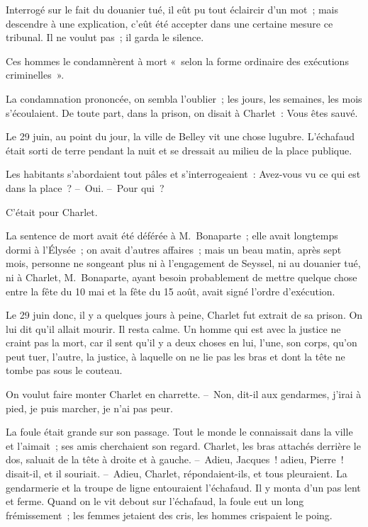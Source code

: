 \documentclass[french,twoside]{book} %
\begin{document}
Interrogé sur le fait du douanier tué, il eût pu tout éclaircir d’un mot ; mais descendre à une explication, c’eût été accepter dans une certaine mesure ce tribunal. Il ne voulut pas ; il garda le silence.\par
Ces hommes le condamnèrent à mort « selon la forme ordinaire des exécutions criminelles ».\par
La condamnation prononcée, on sembla l’oublier ; les jours, les semaines, les mois s’écoulaient. De toute part, dans la prison, on disait à Charlet : Vous êtes sauvé.\par
Le 29 juin, au point du jour, la ville de Belley vit une chose lugubre. L’échafaud était sorti de terre pendant la nuit et se dressait au milieu de la place publique.\par
Les habitants s’abordaient tout pâles et s’interrogeaient : Avez-vous vu ce qui est dans la place ? – Oui. – Pour qui ?\par
C’était pour Charlet.\par
La sentence de mort avait été déférée à M. Bonaparte ; elle avait longtemps dormi à l’Élysée ; on avait d’autres affaires ; mais un beau matin, après sept mois, personne ne songeant plus ni à l’engagement de Seyssel, ni au douanier tué, ni à Charlet, M. Bonaparte, ayant besoin probablement de mettre quelque chose entre la fête du 10 mai et la fête du 15 août, avait signé l’ordre d’exécution.\par
Le 29 juin donc, il y a quelques jours à peine, Charlet fut extrait de sa prison. On lui dit qu’il allait mourir. Il resta calme. Un homme qui est avec la justice ne craint pas la mort, car il sent qu’il y a deux choses en lui, l’une, son corps, qu’on peut tuer, l’autre, la justice, à laquelle on ne lie pas les bras et dont la tête ne tombe pas sous le couteau.\par
On voulut faire monter Charlet en charrette. – Non, dit-il aux gendarmes, j’irai à pied, je puis marcher, je n’ai pas peur.\par
La foule était grande sur son passage. Tout le monde le connaissait dans la ville et l’aimait ; ses amis cherchaient son regard. Charlet, les bras attachés derrière le dos, saluait de la tête à droite et à gauche. – Adieu, Jacques ! adieu, Pierre ! disait-il, et il souriait. – Adieu, Charlet, répondaient-ils, et tous pleuraient. La gendarmerie et la troupe de ligne entouraient l’échafaud. Il y monta d’un pas lent et ferme. Quand on le vit debout sur l’échafaud, la foule eut un long frémissement ; les femmes jetaient des cris, les hommes crispaient le poing.\par
\end{document}
